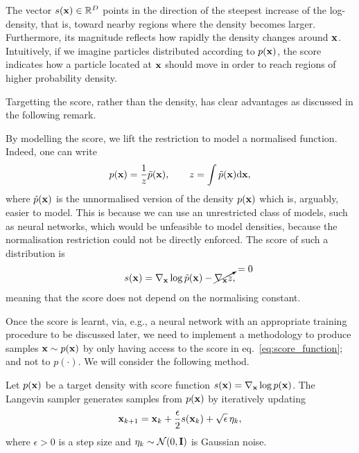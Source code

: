 \begin{remark}[Intuition]
The vector $s({ \mathbf{x}})\in{\mathbb R}^D$ points in the direction of the steepest increase of the log-density, that is, toward nearby regions where the density becomes larger. Furthermore, its magnitude reflects how rapidly the density changes around ${ \mathbf{x}}$. Intuitively, if we imagine particles distributed according to $p({ \mathbf{x}})$, the score indicates how a particle located at ${ \mathbf{x}}$ should move in order to reach regions of higher probability density.
\end{remark}

Targetting the score, rather than the density, has clear advantages as discussed in the following remark. 

\begin{remark}
    By modelling the score, we lift the restriction to model a normalised function. Indeed, one can write 
    \[
    p({ \mathbf{x}}) = \frac{1}{z}\tilde{p}({ \mathbf{x}}), \qquad z = \int \tilde{p}({ \mathbf{x}}){\text{d}}{ \mathbf{x}},
    \]
    where $\tilde{p}({ \mathbf{x}})$ is the unnormalised version of the density $p({ \mathbf{x}})$ which is, arguably, easier to model. This is because we can use an unrestricted class of models, such as neural networks, which would be unfeasible to model densities, because the normalisation restriction could not be directly enforced. The score of such a distribution is
    \[
    s({ \mathbf{x}}) = \nabla_{ \mathbf{x}}\log \tilde{p}({ \mathbf{x}}) - \cancelto{=0}{\nabla_{ \mathbf{x}} z},
    \]
    meaning that the score does not depend on the normalising constant. 
\end{remark}

Once the score is learnt, via, e.g., a neural network with an appropriate training procedure to be discussed later, we need to implement a methodology to produce samples ${ \mathbf{x}}\sim p({ \mathbf{x}})$ by only having access to the score in eq.~\eqref{eq:score_function}; and not to $p(\cdot)$. We will consider the following method. 


\begin{definition}
\label{def:langevin_sampler}
Let $p({ \mathbf{x}})$ be a target density with score function $s({ \mathbf{x}})=\nabla_{ \mathbf{x}} \log p({ \mathbf{x}})$.
The Langevin sampler generates samples from $p({ \mathbf{x}})$ by iteratively updating
\begin{equation}
    { \mathbf{x}}_{k+1} = { \mathbf{x}}_k + \frac{\epsilon}{2}s({ \mathbf{x}}_k) + \sqrt{\epsilon}\,\eta_k,
\end{equation}
where $\epsilon>0$ is a step size and $\eta_k \sim {\mathcal N}(0,{\mathbf I})$ is Gaussian noise.
\end{definition}

